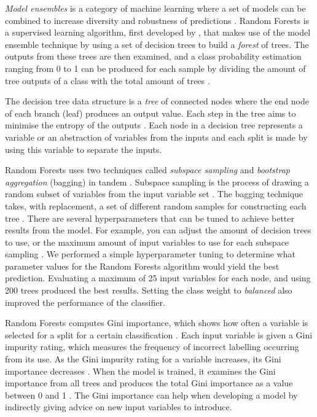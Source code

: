 \documentclass[]{interact}
\theoremstyle{plain}%
\theoremstyle{definition}
\theoremstyle{remark}
\begin{document}
\textit{Model ensembles} is a category of machine learning where a set of models can be combined to increase diversity and robustness of predictions \citep{flach}. Random Forests is a supervised learning algorithm, first developed by \citet{breiman}, that makes use of the model ensemble technique by using a set of decision trees to build a \textit{forest} of trees. The outputs from these trees are then examined, and a class probability estimation ranging from 0 to 1 can be produced for each sample by dividing the amount of tree outputs of a class with the total amount of trees \citep{breiman}.

The decision tree data structure is a \textit{tree} of connected nodes where the end node of each branch (leaf) produces an output value. Each step in the tree aims to minimise the entropy of the outputs \citep{kotsiantis}. Each node in a decision tree represents a variable or an abstraction of variables from the inputs and each split is made by using this variable to separate the inputs.

Random Forests uses two techniques called \textit{subspace sampling} and \textit{bootstrap aggregation} (bagging) in tandem \citep{breiman}. Subspace sampling is the process of drawing a random subset of variables from the input variable set \citet{ho}. The bagging technique takes, with replacement, a set of different random samples for constructing each tree \citep{flach}. There are several hyperparameters that can be tuned to achieve better results from the model. For example, you can adjust the amount of decision trees to use, or the maximum amount of input variables to use for each subspace sampling \citep{scikit-learn}. We performed a simple hyperparameter tuning to determine what parameter values for the Random Forests algorithm would yield the best prediction. Evaluating a maximum of 25 input variables for each node, and using 200 trees produced the best results. Setting the class weight to \textit{balanced} also improved the performance of the classifier.

\newpage

Random Forests computes Gini importance, which shows how often a variable is selected for a split for a certain classification \citep{gini}. Each input variable is given a Gini impurity rating, which measures the frequency of incorrect labelling occurring from its use. As the Gini impurity rating for a variable increases, its Gini importance decreases \citep{gini}. When the model is trained, it examines the Gini importance from all trees and produces the total Gini importance as a value between 0 and 1 \citep{gini}. The Gini importance can help when developing a model by indirectly giving advice on new input variables to introduce.
\end{document}
